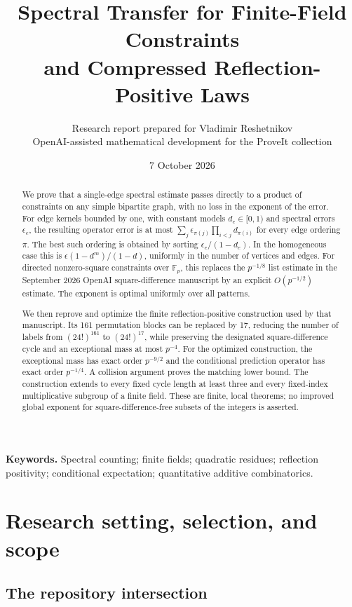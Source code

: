 \documentclass[11pt,a4paper]{article}
\title{\color{ink}\textbf{Spectral Transfer for Finite-Field Constraints}\\[4pt]
\Large and Compressed Reflection-Positive Laws}
\author{Research report prepared for Vladimir Reshetnikov\\
\small OpenAI-assisted mathematical development for the ProveIt collection}
\date{7 October 2026}
\numberwithin{equation}{section}
\theoremstyle{definition}
\theoremstyle{remark}
\newcommand{\F}{\mathbb F}
\begin{document}
\maketitle
\begin{abstract}
We prove that a single-edge spectral estimate passes directly to a product
of constraints on any simple bipartite graph, with no loss in the exponent
of the error. For edge kernels bounded by one, with constant models
$d_e\in[0,1)$ and spectral errors $\epsilon_e$, the resulting operator error is
at most $\sum_j\epsilon_{\pi(j)}\prod_{i<j}d_{\pi(i)}$ for every edge
ordering $\pi$. The best such ordering is obtained by sorting
$\epsilon_e/(1-d_e)$. In the homogeneous case this is
$\epsilon(1-d^m)/(1-d)$, uniformly in the number of vertices and edges.
For directed nonzero-square constraints over $\F_p$, this replaces the
$p^{-1/8}$ list estimate in the September 2026 OpenAI square-difference
manuscript by an explicit $O(p^{-1/2})$ estimate. The exponent is optimal
uniformly over all patterns.

We then reprove and optimize the finite reflection-positive construction
used by that manuscript. Its 161 permutation blocks can be replaced by
17, reducing the number of labels from $(24!)^{161}$ to $(24!)^{17}$,
while preserving the designated square-difference cycle and an exceptional
mass at most $p^{-4}$. For the optimized construction, the exceptional
mass has exact order $p^{-9/2}$ and the conditional prediction operator
has exact order $p^{-1/4}$. A collision argument proves the matching lower
bound. The construction extends to every fixed cycle length at least
three and every fixed-index multiplicative subgroup of a finite field.
These are finite, local theorems; no improved global exponent for
square-difference-free subsets of the integers is asserted.
\end{abstract}
\vspace{2mm}
\noindent\textbf{Keywords.} Spectral counting; finite fields; quadratic residues;
reflection positivity; conditional expectation; quantitative additive combinatorics.
\setcounter{tocdepth}{1}
\begingroup\small
\tableofcontents
\endgroup
\newpage

\section{Research setting, selection, and scope}
\label{sec:setting}

\subsection{The repository intersection}
\end{document}
